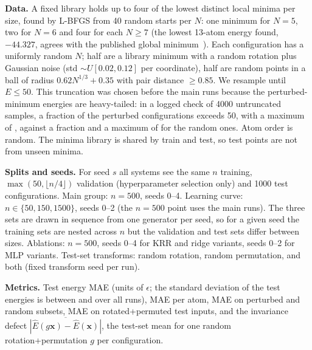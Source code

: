 \textbf{Data.} A fixed library holds up to four of the lowest distinct local minima per size, found by L-BFGS from 40 random starts per $N$: one minimum for $N{=}5$, two for $N{=}6$ and four for each $N\ge7$ (the lowest 13-atom energy found, $-44.327$, agrees with the published global minimum~\cite{wales1997global}). Each configuration has a uniformly random $N$; half are a library minimum with a random rotation plus Gaussian noise (std $\sim U[0.02,0.12]$ per coordinate), half are random points in a ball of radius $0.62N^{1/3}+0.35$ with pair distance $\ge0.85$. We resample until $E\le50$. This truncation was chosen before the main runs because the perturbed-minimum energies are heavy-tailed: in a logged check of 4000 untruncated samples, a fraction  of the perturbed configurations exceeds 50, with a maximum of , against a fraction  and a maximum of  for the random ones. Atom order is random. The minima library is shared by train and test, so test points are not from unseen minima.

\textbf{Splits and seeds.} For seed $s$ all systems see the same $n$ training, $\max(50,\lfloor n/4\rfloor)$ validation (hyperparameter selection only) and 1000 test configurations. Main group: $n{=}500$, seeds 0--4. Learning curve: $n\in\{50,150,1500\}$, seeds 0--2 (the $n{=}500$ point uses the main runs). The three sets are drawn in sequence from one generator per seed, so for a given seed the training sets are nested across $n$ but the validation and test sets differ between sizes. Ablations: $n{=}500$, seeds 0--4 for KRR and ridge variants, seeds 0--2 for MLP variants. Test-set transforms: random rotation, random permutation, and both (fixed transform seed per run).

\textbf{Metrics.} Test energy MAE (units of $\epsilon$; the standard deviation of the test energies is between  and  over all runs), MAE per atom, MAE on perturbed and random subsets, MAE on rotated+permuted test inputs, and the invariance defect $\overline{|\hat E(g\mathbf x)-\hat E(\mathbf x)|}$, the test-set mean for one random rotation+permutation $g$ per configuration.

